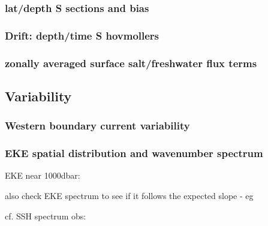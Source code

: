 \documentclass[11pt, a4paper]{article}
\begin{document}
\subsubsection{lat/depth S sections and bias}
\subsubsection{Drift: depth/time S hovmollers}
\subsubsection{zonally averaged surface salt/freshwater flux terms}

\subsection{Variability}
\citet{DanabasogluYeagerKimBehrensBentsenBiBiastochBleckBoning2016a}
\subsubsection{Western boundary current variability}
\subsubsection{EKE spatial distribution and wavenumber spectrum}

EKE near 1000dbar: \citet{OllitraultColindeVerdiere2014a}

also check EKE spectrum to see if it follows the expected slope - eg \citet{CapetMcWilliamsMolemakerShchepetkin2008a}

cf. SSH spectrum obs: \citet{XuFu2011a,XuFu2012a}
%
\end{document}
